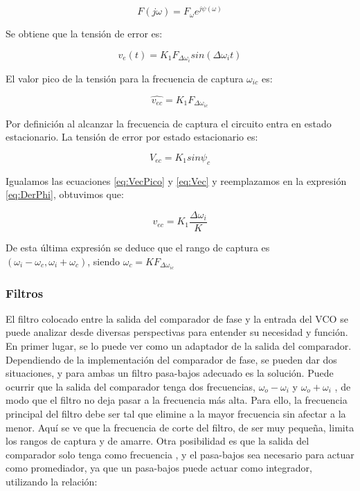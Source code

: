 \documentclass[10pt,a4paper]{article}
\begin{document}
\begin{equation}
F(j\omega) = F_{\omega}e^{j\psi(\omega)}
\end{equation}

Se obtiene que la tensión de error es:

\begin{equation}
v_e(t) = K_1F_{\Delta\omega_i}sin(\Delta\omega_i t)
\end{equation}

El valor pico de la tensión para la frecuencia de captura $\omega_{ic}$ es:

\begin{equation}
	\hat{v_{ec}} = K_1F_{\Delta\omega_{ic}}
	\label{eq:VecPico}
\end{equation}

Por definición al alcanzar la frecuencia de captura el circuito entra en estado estacionario. La tensión de error por estado estacionario es:

\begin{equation}
	V_{ec} = K_1 sin\psi_c
	\label{eq:Vec}
\end{equation}

Igualamos las ecuaciones \ref{eq:VecPico} y \ref{eq:Vec} y reemplazamos en la expresión \ref{eq:DerPhi}, obtuvimos que:

\begin{equation}
	v_{ec} = K_1 \frac{\Delta\omega_i}{K}
	\label{eq:finalVec}
\end{equation}

De esta última expresión se deduce que el rango de captura es $(\omega_i-\omega_c , \omega_i+\omega_c)$, siendo $\omega_c = KF_{\Delta\omega_{ic}}$

\subsubsection{Filtros}

El filtro colocado entre la salida del comparador de fase y la entrada del VCO se puede analizar desde diversas perspectivas para entender su necesidad y función.
En primer lugar, se lo puede ver como un adaptador de la salida del comparador. Dependiendo de la implementación del comparador de fase, se pueden dar dos situaciones, y para ambas un filtro pasa-bajos adecuado es la solución.
Puede ocurrir que la salida del comparador tenga dos frecuencias, $\omega_o - \omega_i$ y $\omega_o + \omega_i$ , de modo que el filtro no deja pasar a la frecuencia más alta. Para ello, la frecuencia principal del filtro debe ser tal que elimine a la mayor frecuencia sin afectar a la menor. Aquí se ve que la frecuencia de corte del filtro, de ser muy pequeña, limita los rangos de captura y de amarre.
Otra posibilidad es que la salida del comparador solo tenga como frecuencia , y el pasa-bajos sea necesario para actuar como promediador, ya que un pasa-bajos puede actuar como integrador, utilizando la relación:
\end{document}
